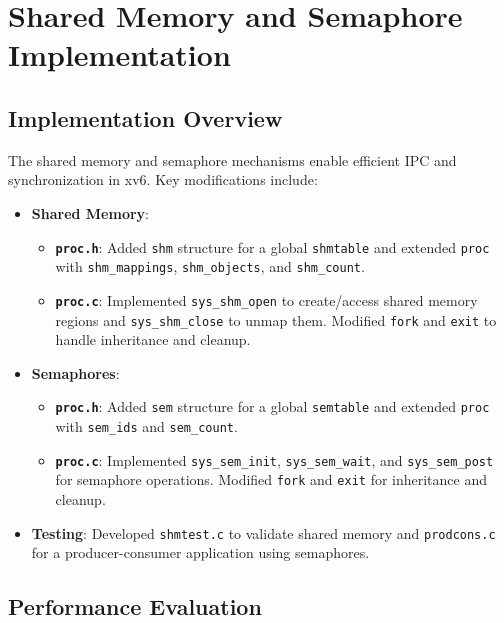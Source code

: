 \documentclass[12pt]{article}
\begin{document}
\section{Shared Memory and Semaphore Implementation}
\label{sec:shared-memory-semaphore}

\subsection{Implementation Overview}
\label{subsec:shared-implementation}

The shared memory and semaphore mechanisms enable efficient IPC and synchronization in xv6. Key modifications include:

\begin{itemize}
    \item \textbf{Shared Memory}:
    \begin{itemize}
        \item \textbf{\texttt{proc.h}}: Added \texttt{shm} structure for a global \texttt{shmtable} and extended \texttt{proc} with \texttt{shm\_mappings}, \texttt{shm\_objects}, and \texttt{shm\_count}.
        \item \textbf{\texttt{proc.c}}: Implemented \texttt{sys\_shm\_open} to create/access shared memory regions and \texttt{sys\_shm\_close} to unmap them. Modified \texttt{fork} and \texttt{exit} to handle inheritance and cleanup.
    \end{itemize}
    \item \textbf{Semaphores}:
    \begin{itemize}
        \item \textbf{\texttt{proc.h}}: Added \texttt{sem} structure for a global \texttt{semtable} and extended \texttt{proc} with \texttt{sem\_ids} and \texttt{sem\_count}.
        \item \textbf{\texttt{proc.c}}: Implemented \texttt{sys\_sem\_init}, \texttt{sys\_sem\_wait}, and \texttt{sys\_sem\_post} for semaphore operations. Modified \texttt{fork} and \texttt{exit} for inheritance and cleanup.
    \end{itemize}
    \item \textbf{Testing}: Developed \texttt{shmtest.c} to validate shared memory and \texttt{prodcons.c} for a producer-consumer application using semaphores.
\end{itemize}

\subsection{Performance Evaluation}
\label{subsec:shared-performance}
\end{document}
